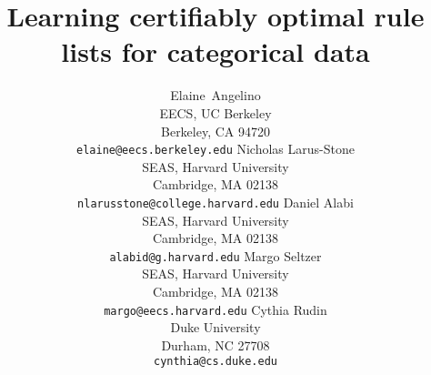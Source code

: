 \documentclass{article}
\title{Learning certifiably optimal rule lists for categorical data}
\author{
  Elaine~Angelino\\
  EECS, UC Berkeley\\
  Berkeley, CA 94720\\
  \texttt{elaine@eecs.berkeley.edu}
  \And
  Nicholas Larus-Stone\\
  SEAS, Harvard University\\
  Cambridge, MA 02138\\
  \texttt{nlarusstone@college.harvard.edu}
  \And
  Daniel Alabi\\
  SEAS, Harvard University\\
  Cambridge, MA 02138\\
  \texttt{alabid@g.harvard.edu}
  \And
  Margo Seltzer\\
  SEAS, Harvard University\\
  Cambridge, MA 02138\\
  \texttt{margo@eecs.harvard.edu}
  \And
  Cythia Rudin\\
  Duke University\\
  Durham, NC 27708\\
  \texttt{cynthia@cs.duke.edu}
}
\begin{document}

\maketitle

\begin{abstract}

\end{abstract}















\small


\end{document}
